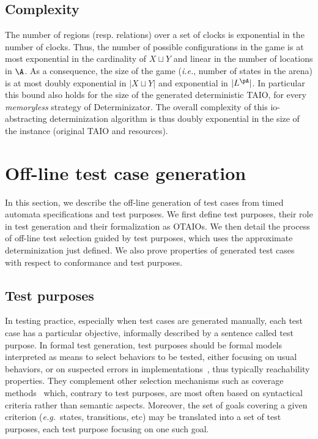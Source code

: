 \documentclass{LMCS}
\theoremstyle{plain}\newtheorem{proposition}[thm]{Proposition}
\def\eg{{\em e.g.}}
\begin{document}
\subsection*{Complexity} The number of regions (resp. relations)
  over a set of clocks is exponential in the number of clocks. Thus,
  the number of possible configurations in the game is at most exponential in the
  cardinality of $X\sqcup Y$ and linear in the number of locations in
  $\A$. As a consequence, the size of the game (\emph{i.e.}, number of
  states in the arena) is at most doubly exponential in $|X\sqcup Y|$
  and exponential in $|L^\pA|$. In particular this bound also holds
  for the size of the generated deterministic TAIO, for every
  \emph{memoryless} strategy of Determinizator. The overall complexity
  of this io-abstracting determinization algorithm is thus doubly
  exponential in the size of the instance (original TAIO and
  resources).


\section{Off-line test case generation}
\label{sec-generation}
In this section, we describe the off-line generation of test cases from 
timed automata specifications and test purposes.
We first define test purposes, their role in test generation 
and their formalization as OTAIOs.
We then detail the process of
off-line test selection guided by test purposes, which uses 
the approximate determinization just defined.
We also prove properties of generated test cases with respect 
to conformance and test purposes.

\subsection{Test purposes}

In testing practice, especially when test cases are
generated manually, each test case has a particular objective,
informally described by a sentence called test purpose.
In formal test generation, test purposes should be formal models 
interpreted as means to select behaviors to be tested,
either focusing on usual behaviors, or on suspected errors in
implementations~\cite{jard04a}, thus typically reachability properties.  
They complement other selection mechanisms 
such as coverage methods~\cite{Zhu-Hall-May-97} which, contrary to test purposes,
are most often based on syntactical criteria rather than semantic aspects.
Moreover, the set of goals
covering a given criterion  (\eg~states, transitions, etc) 
may be translated into a set of test purposes,
each test purpose focusing on one such goal.
\end{document}
